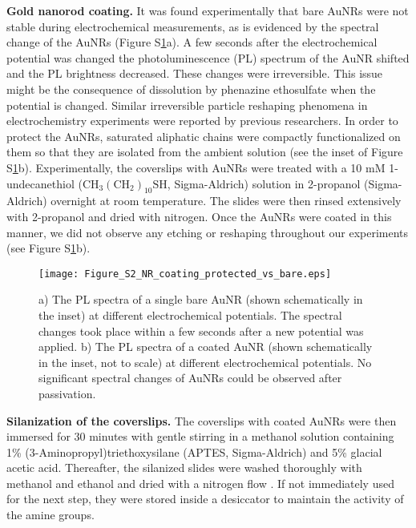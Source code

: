 \documentclass[11pt,a4paper,onecolumn]{article}
\newcommand*\chem[1]{\ensuremath{\mathrm{#1}}}
\begin{document}
\textbf{Gold nanorod coating.} It was found experimentally that bare AuNRs were not stable during electrochemical measurements, as is evidenced by the spectral change of the AuNRs (Figure S\ref{fg:NR_coating}a). A few seconds after the electrochemical potential was changed the photoluminescence (PL) spectrum of the AuNR shifted and the PL brightness decreased. These changes were irreversible. This issue might be the consequence of dissolution by phenazine ethosulfate when the potential is changed. Similar irreversible particle reshaping phenomena in electrochemistry experiments were reported by previous researchers. \cite{Hoener2016JPCC,Byers2014} In order to protect the AuNRs, saturated aliphatic chains were compactly functionalized on them so that they are isolated from the ambient solution (see the inset of Figure S\ref{fg:NR_coating}b). Experimentally, the coverslips with AuNRs were treated with a 10 mM 1-undecanethiol (\chem{CH_3(CH_2)_{10}SH}, Sigma-Aldrich) solution in 2-propanol (Sigma-Aldrich) overnight at room temperature. The slides were then rinsed extensively with 2-propanol and dried with nitrogen. Once the AuNRs were coated in this manner, we did not observe any etching or reshaping throughout our experiments (see Figure S\ref{fg:NR_coating}b).

\begin{figure}
  \centering
  \texttt{[image: Figure\_S2\_NR\_coating\_protected\_vs\_bare.eps]}
	\makeatletter
	\renewcommand{\fnum@figure}{\figurename~S\thefigure}
	\makeatother
  \caption{ a) The PL spectra of a single bare AuNR (shown schematically in the inset) at different electrochemical potentials. The spectral changes took place within a few seconds after a new potential was applied. b) The PL spectra of a coated AuNR (shown schematically in the inset, not to scale) at different electrochemical potentials. No significant spectral changes of AuNRs could be observed after passivation.
	}
  \label{fg:NR_coating}
\end{figure}


\textbf{Silanization of the coverslips.} The coverslips with coated AuNRs were then immersed for 30 minutes with gentle stirring in a methanol solution containing 1\% (3-Aminopropyl)triethoxysilane (APTES, Sigma-Aldrich) and 5\% glacial acetic acid. Thereafter, the silanized slides were washed thoroughly with methanol and ethanol and dried with a nitrogen flow \cite{Gupta2014JACS}. If not immediately used for the next step, they were stored inside a desiccator to maintain the activity of the amine groups. 
\end{document}
